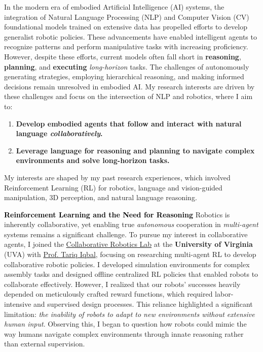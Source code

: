 \documentclass[10pt]{article}
\newcommand{\statement}[1]{\medskip\noindent
  \textcolor{black}{\textbf{#1}}\space
}
\begin{document}
\noindent In the modern era of embodied Artificial Intelligence (AI) systems, the integration of Natural Language Processing (NLP) and Computer Vision (CV) foundational models trained on extensive data has propelled efforts to develop generalist robotic policies. These advancements have enabled intelligent agents to recognize patterns and perform manipulative tasks with increasing proficiency. However, despite these efforts, current models often fall short in \textbf{reasoning}, \textbf{planning}, and \textbf{executing} \textit{long-horizon} tasks. The challenges of autonomously generating strategies, employing hierarchical reasoning, and making informed decisions remain unresolved in embodied AI. My research interests are driven by these challenges and focus on the intersection of NLP and robotics, where I aim to:
\begin{enumerate}[label=(\arabic*), itemindent=0pt, itemsep=0pt, parsep=0pt, nosep]
  \item \textbf{Develop embodied agents that follow and interact with natural language \textit{collaboratively}.}
  \item \textbf{Leverage language for reasoning and planning to navigate complex environments and solve long-horizon tasks.}
\end{enumerate}
My interests are shaped by my past research experiences, which involved Reinforcement Learning (RL) for robotics, language and vision-guided manipulation, 3D perception, and natural language reasoning.

\statement{Reinforcement Learning and the Need for Reasoning} Robotics is inherently collaborative, yet enabling true \textit{autonomous} cooperation in \textit{multi-agent} systems remains a significant challenge. To pursue my interest in collaborative agents, I joined the \href{https://www.collabrobotics.com/}{Collaborative Robotics Lab} at the \textbf{University of Virginia} (UVA) with  \href{https://www.tiqbal.com/}{Prof. Tariq Iqbal}, focusing on researching multi-agent RL to develop collaborative robotic policies. I developed simulation environments for complex assembly tasks and designed offline centralized RL policies that enabled robots to collaborate effectively. However, I realized that our robots' successes heavily depended on meticulously crafted reward functions, which required labor-intensive and supervised design processes. This reliance highlighted a significant limitation: \textit{the inability of robots to adapt to new environments without extensive human input}. Observing this, I began to question how robots could mimic the way humans navigate complex environments through innate reasoning rather than external supervision.
\end{document}
